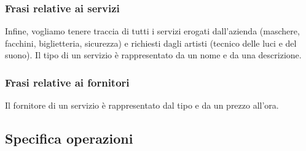 \documentclass[a4paper,11pt]{article}
\begin{document}
\subsubsection*{Frasi relative ai servizi}

Infine, vogliamo tenere traccia di tutti i servizi erogati dall'azienda (maschere, facchini, biglietteria, sicurezza) e richiesti dagli artisti (tecnico delle luci e del suono). Il tipo di un servizio è rappresentato da un nome e da una descrizione.

\subsubsection*{Frasi relative ai fornitori}

Il fornitore di un servizio è rappresentato dal tipo e da un prezzo all'ora.

\subsection{Specifica operazioni}
\end{document}
